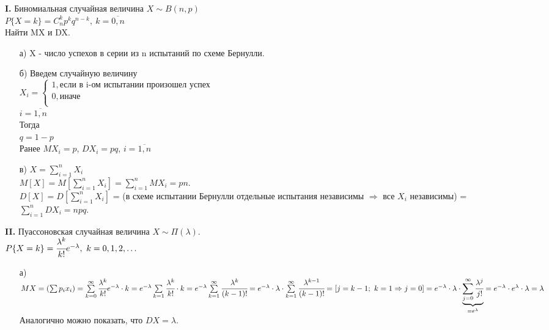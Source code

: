 

\textbf{I.} Биномиальная случайная величина $X \sim B(n,p)$ \\
$P\{X = k\} = C^k_n p^k q^{n-k}, \ k = \overline{0,n}$ \\
Найти MX и DX.\\
\begin{enumerate}
	\item[а)] X - число успехов в серии из n испытаний по схеме Бернулли.
	
	\item[б)] Введем случайную величину\\
	$X_i = 
	\begin{cases}
		1, \text{если в i-ом испытании произошел успех} \\
		0, \text{иначе}\\
	\end{cases}$\\
	$i = \overline{1,n}$\\
	Тогда\\
	$q = 1 - p$\\
	Ранее $MX_i = p$, $DX_i = pq$, $i = \overline{1,n}$
	
	\item[в)] $X = \sum\limits_{i = 1}^n X_i$\\
	$M[X] = M\left[\sum\limits_{i = 1}^n X_i\right] = \sum\limits_{i = 1}^n MX_i = pn$.\\
	$D[X] = D\left[\sum\limits_{i = 1}^n X_i\right]$ = (в схеме испытании Бернулли отдельные испытания независимы $\Rightarrow$ все $X_i$ независимы) = $\sum\limits_{i = 1}^n DX_i = npq$.\\
\end{enumerate}


\textbf{II.} Пуассоновская случайная величина $X \sim \Pi(\lambda)$.\\
$P\{X = k\} = \cfrac{\lambda^k}{k!} e^{-\lambda}, \ k = 0, 1, 2, \ldots$\\
\begin{enumerate}
	\item[а)] $MX = \left(\sum p_i x_i\right) = \sum\limits_{k = 0}^\infty \cfrac{\lambda^k}{k!} e^{-\lambda} \cdot k = e^{-\lambda} \sum\limits_{k = 1} \cfrac{\lambda^k}{k!} \cdot k = e^{-\lambda} \sum\limits_{k = 1}^\infty \cfrac{\lambda^k}{(k - 1)!} = e^{-\lambda} \cdot \lambda \cdot \sum\limits_{k = 1}^\infty \cfrac{\lambda^{k - 1}}{(k - 1)!} = \left[j = k - 1; \ k = 1 \Rightarrow j = 0\right]= e^{-\lambda} \cdot \lambda \cdot \underbrace{\sum\limits_{j = 0}^\infty \cfrac{\lambda^j}{j!}}_{= e^\lambda} = e^{-\lambda} \cdot e^\lambda \cdot \lambda = \lambda$\\
	Аналогично можно показать, что $DX = \lambda$.
\end{enumerate}


